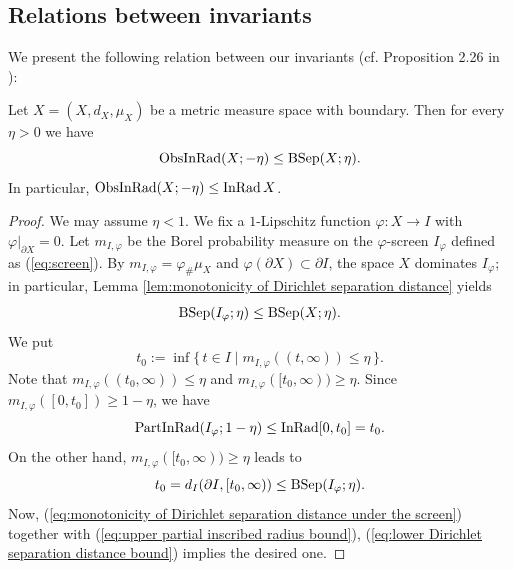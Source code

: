 \subsection{Relations between invariants}

We present the following relation between our invariants (cf. Proposition 2.26 in \cite{Sh}):
\begin{lem}\label{lem:observable inscribed radius is smaller than Dirichlet separation distance}
Let $X=(X,d_{X},\mu_{X})$ be a metric measure space with boundary.
Then for every $\eta>0$
we have
\begin{equation*}
\operatorname{ObsInRad}(X;-\eta)\leq \operatorname{BSep}(X;\eta).
\end{equation*}
In particular,
$\operatorname{ObsInRad}(X;-\eta)\leq \operatorname{InRad} X$.
\end{lem}
\begin{proof}
We may assume $\eta<1$.
We fix a $1$-Lipschitz function $\varphi:X\to I$ with $\varphi|_{\partial X}=0$.
Let $m_{I,\varphi}$ be the Borel probability measure on the $\varphi$-screen $I_{\varphi}$ defined as (\ref{eq:screen}).
By $m_{I,\varphi}=\varphi_{\#}\mu_{X}$ and $\varphi(\partial X)\subset \partial I$,
the space $X$ dominates $I_{\varphi}$;
in particular,
Lemma \ref{lem:monotonicity of Dirichlet separation distance} yields
\begin{equation}\label{eq:monotonicity of Dirichlet separation distance under the screen}
\operatorname{BSep}(I_{\varphi};\eta) \leq \operatorname{BSep}(X;\eta).
\end{equation}
We put
\begin{equation*}
t_{0}:=\inf\{\,t\in I \mid m_{I,\varphi}((t,\infty))\leq \eta \,\}.
\end{equation*}
Note that
$m_{I,\varphi}((t_{0},\infty))\leq \eta$ and $m_{I,\varphi}([t_{0},\infty))\geq \eta$.
Since $m_{I,\varphi}([0,t_{0}])\geq 1-\eta$,
we have
\begin{equation}\label{eq:upper partial inscribed radius bound}
\operatorname{PartInRad}(I_{\varphi};1-\eta)\leq \operatorname{InRad} [0,t_{0}]= t_{0}.
\end{equation}
On the other hand,
$m_{I,\varphi}([t_{0},\infty))\geq \eta$ leads to
\begin{equation}\label{eq:lower Dirichlet separation distance bound}
t_{0}=d_{I}(\partial I,[t_{0},\infty)) \leq \operatorname{BSep}(I_{\varphi};\eta).
\end{equation}
Now,
(\ref{eq:monotonicity of Dirichlet separation distance under the screen}) together with (\ref{eq:upper partial inscribed radius bound}), (\ref{eq:lower Dirichlet separation distance bound}) implies the desired one.
\end{proof}

